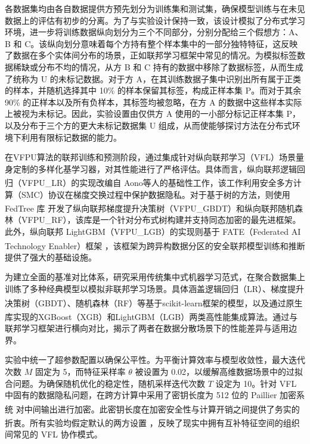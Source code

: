 各数据集均由各自数据提供方预先划分为训练集和测试集，确保模型训练与在未见数据上的评估有初步的分离。为了与实验设计保持一致，该设计模拟了分布式学习环境，进一步将训练数据纵向划分为三个不同部分，分别分配给三个假想方：A、B 和 C。该纵向划分意味着每个方持有整个样本集中的一部分独特特征，这反映了数据在多个实体间分布的场景，正如联邦学习框架中常见的情况。为模拟标签数据稀缺或分布不均的情况，从方 B 和 C 持有的数据中移除了数据标签，从而生成了统称为 U 的未标记数据。对于方 A，在其训练数据子集中识别出所有属于正类的样本，并随机选择其中 10\% 的样本保留其标签，构成正样本集 P。而对于其余 90\% 的正样本以及所有负样本，其标签均被忽略，在方 A 的数据中这些样本实际上被视为未标记。因此，实验设置由仅供方 A 使用的一小部分标记正样本集 P，以及分布于三个方的更大未标记数据集 U 组成，从而使能够探讨方法在分布式环境下利用有限标记数据的能力。

在VFPU算法的联邦训练和预测阶段，通过集成针对纵向联邦学习（VFL）场景量身定制的多样化基学习器，对其性能进行了严格评估。具体而言，纵向联邦逻辑回归（VFPU\_LR）的实现改编自 Aono\textsuperscript{\cite{aono2016scalable}}等人的基础性工作，该工作利用安全多方计算（SMC）协议在梯度交换过程中保护数据隐私。对于基于树的方法，则使用 FedTree 库 \textsuperscript{\cite{li2022fedtree}} 开发了纵向联邦梯度提升决策树（VFPU\_GBDT）和纵向联邦随机森林（VFPU\_RF），该库是一个针对分布式树构建并支持同态加密的最先进框架。此外，纵向联邦 LightGBM（VFPU\_LGB）的实现则基于 FATE（Federated AI Technology Enabler）框架 \textsuperscript{\cite{liu2021fate}}，该框架为跨异构数据分区的安全联邦模型训练和推断提供了强大的基础设施。  

为建立全面的基准对比体系，研究采用传统集中式机器学习范式，在聚合数据集上训练了多种经典模型以模拟非联邦学习场景。具体涵盖逻辑回归（LR）、梯度提升决策树（GBDT）、随机森林（RF）等基于scikit-learn框架\textsuperscript{\cite{pedregosa2011scikit}}的模型，以及通过原生库实现的XGBoost（XGB）\textsuperscript{\cite{chen2015xgboost}}和LightGBM（LGB）\textsuperscript{\cite{ke2017lightgbm}}两类高性能集成算法。通过与联邦学习框架进行横向对比，揭示了两者在数据分散场景下的性能差异与适用边界。


实验中统一了超参数配置以确保公平性。为平衡计算效率与模型收敛性，最大迭代次数 $ M $ 固定为 5，而特征采样率 $ \theta $ 被设置为 0.02，以缓解高维数据场景中的过拟合问题。为确保随机优化的稳定性，随机采样迭代次数 $ T $ 设定为 10。针对 VFL 中固有的数据隐私问题，在跨方计算中采用了密钥长度为 512 位的 Paillier 加密系统 \textsuperscript{\cite{paillier1999public}} 对中间输出进行加密。此密钥长度在加密安全性与计算开销之间提供了务实的折衷。所有实验均假定默认的两方设置 \textsuperscript{\cite{li2022fedtree}}，反映了现实中拥有互补特征空间的组织间常见的 VFL 协作模式。  

